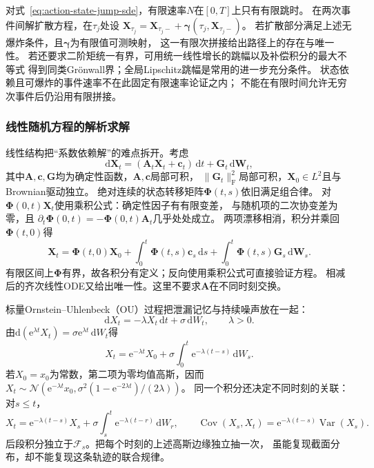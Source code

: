 对式~\eqref{eq:action-state-jump-sde}，有限速率$N$在$[0,T]$上只有有限跳时。
在两次事件间解扩散方程，在$\tau_j$处设
$\bm X_{\tau_j}=\bm X_{\tau_j-}
                    +\bm\gamma(\tau_j,\bm X_{\tau_j-})$。
若扩散部分满足上述无爆炸条件，且$\bm\gamma$为有限值可测映射，
这一有限次拼接给出路径上的存在与唯一性。
若还要求二阶矩统一有界，可用统一线性增长的跳幅以及补偿积分的最大不等式
得到同类Grönwall界；全局Lipschitz跳幅是常用的进一步充分条件。
状态依赖且可爆炸的事件速率不在此固定有限速率论证之内；
不能在有限时间允许无穷次事件后仍沿用有限拼接。

\subsubsection{线性随机方程的解析求解}
\label{sec:action-state-linear-sde-solution}

线性结构把“系数依赖解”的难点拆开。考虑
\[
 \mathrm d\bm X_t=(\bm A_t\bm X_t+\bm c_t)\,\mathrm dt
                       +\bm G_t\,\mathrm d\bm W_t,
\]
其中$\bm A,\bm c,\bm G$均为确定性函数，$\bm A,\bm c$局部可积，
$\|\bm G_t\|_{\mathrm F}^2$局部可积，$\bm X_0\in L^2$且与Brownian驱动独立。
绝对连续的状态转移矩阵$\bm\Phi(t,s)$依旧满足组合律。
对$\bm\Phi(0,t)\bm X_t$使用乘积公式：确定性因子有有限变差，
与随机项的二次协变差为零，且
$\partial_t\bm\Phi(0,t)=-\bm\Phi(0,t)\bm A_t$几乎处处成立。
两项漂移相消，积分并乘回$\bm\Phi(t,0)$得
\begin{equation}
 \bm X_t=\bm\Phi(t,0)\bm X_0+
       \int_0^t\bm\Phi(t,s)\bm c_s\,\mathrm ds+
       \int_0^t\bm\Phi(t,s)\bm G_s\,\mathrm d\bm W_s.
 \label{eq:action-state-linear-sde-solution}
\end{equation}
有限区间上$\bm\Phi$有界，故各积分有定义；反向使用乘积公式可直接验证方程。
相减后的齐次线性ODE又给出唯一性。这里不要求$\bm A$在不同时刻交换。

标量Ornstein--Uhlenbeck（OU）过程把泄漏记忆与持续噪声放在一起：
\begin{equation}
 \mathrm dX_t=-\lambda X_t\,\mathrm dt+\sigma\,\mathrm dW_t,\qquad\lambda>0.
 \label{eq:dynamical-ou-sde}
\end{equation}
由$\mathrm d(\mathrm e^{\lambda t}X_t)=
\sigma\mathrm e^{\lambda t}\,\mathrm dW_t$得
\[
 X_t=\mathrm e^{-\lambda t}X_0+
                  \sigma\int_0^t\mathrm e^{-\lambda(t-s)}\,\mathrm dW_s.
\]
若$X_0=x_0$为常数，第二项为零均值高斯，因而
$X_t\sim\mathcal N(\mathrm e^{-\lambda t}x_0,
\sigma^2(1-\mathrm e^{-2\lambda t})/(2\lambda))$。
同一个积分还决定不同时刻的关联：对$s\leq t$，
\[
 X_t=\mathrm e^{-\lambda(t-s)}X_s+
          \sigma\int_s^t\mathrm e^{-\lambda(t-r)}\,\mathrm dW_r,
 \qquad
 \operatorname{Cov}(X_s,X_t)=
          \mathrm e^{-\lambda(t-s)}\operatorname{Var}(X_s).
\]
后段积分独立于$\mathcal F_s$。把每个时刻的上述高斯边缘独立抽一次，
虽能复现截面分布，却不能复现这条轨迹的联合规律。

